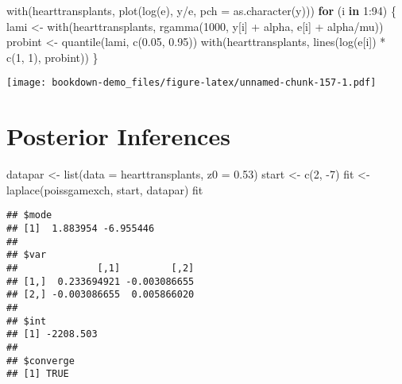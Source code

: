 \documentclass[
]{book}
\newenvironment{Shaded}{\begin{snugshade}}{\end{snugshade}}
\newcommand{\AttributeTok}[1]{\textcolor[rgb]{0.77,0.63,0.00}{#1}}
\newcommand{\ControlFlowTok}[1]{\textcolor[rgb]{0.13,0.29,0.53}{\textbf{#1}}}
\newcommand{\DecValTok}[1]{\textcolor[rgb]{0.00,0.00,0.81}{#1}}
\newcommand{\FloatTok}[1]{\textcolor[rgb]{0.00,0.00,0.81}{#1}}
\newcommand{\FunctionTok}[1]{\textcolor[rgb]{0.00,0.00,0.00}{#1}}
\newcommand{\NormalTok}[1]{#1}
\newcommand{\OtherTok}[1]{\textcolor[rgb]{0.56,0.35,0.01}{#1}}
\newcommand{\SpecialCharTok}[1]{\textcolor[rgb]{0.00,0.00,0.00}{#1}}
\begin{document}
\begin{Shaded}
\begin{Highlighting}[]
\FunctionTok{with}\NormalTok{(hearttransplants,}
     \FunctionTok{plot}\NormalTok{(}\FunctionTok{log}\NormalTok{(e), y}\SpecialCharTok{/}\NormalTok{e, }\AttributeTok{pch =} \FunctionTok{as.character}\NormalTok{(y)))}
 \ControlFlowTok{for}\NormalTok{ (i }\ControlFlowTok{in} \DecValTok{1}\SpecialCharTok{:}\DecValTok{94}\NormalTok{) \{}
\NormalTok{     lami }\OtherTok{\textless{}{-}} \FunctionTok{with}\NormalTok{(hearttransplants,}
           \FunctionTok{rgamma}\NormalTok{(}\DecValTok{1000}\NormalTok{, y[i] }\SpecialCharTok{+}\NormalTok{ alpha, }
\NormalTok{               e[i] }\SpecialCharTok{+}\NormalTok{ alpha}\SpecialCharTok{/}\NormalTok{mu))}
\NormalTok{     probint }\OtherTok{\textless{}{-}} \FunctionTok{quantile}\NormalTok{(lami, }\FunctionTok{c}\NormalTok{(}\FloatTok{0.05}\NormalTok{, }\FloatTok{0.95}\NormalTok{))}
     \FunctionTok{with}\NormalTok{(hearttransplants,}
          \FunctionTok{lines}\NormalTok{(}\FunctionTok{log}\NormalTok{(e[i]) }\SpecialCharTok{*} \FunctionTok{c}\NormalTok{(}\DecValTok{1}\NormalTok{, }\DecValTok{1}\NormalTok{), probint))}
\NormalTok{ \}}
\end{Highlighting}
\end{Shaded}

\texttt{[image: bookdown-demo\_files/figure-latex/unnamed-chunk-157-1.pdf]}

\hypertarget{posterior-inferences}{%
\section{Posterior Inferences}\label{posterior-inferences}}

\begin{Shaded}
\begin{Highlighting}[]
\NormalTok{datapar }\OtherTok{\textless{}{-}} \FunctionTok{list}\NormalTok{(}\AttributeTok{data =}\NormalTok{ hearttransplants, }\AttributeTok{z0 =} \FloatTok{0.53}\NormalTok{)}
\NormalTok{start }\OtherTok{\textless{}{-}} \FunctionTok{c}\NormalTok{(}\DecValTok{2}\NormalTok{, }\SpecialCharTok{{-}}\DecValTok{7}\NormalTok{)}
\NormalTok{fit }\OtherTok{\textless{}{-}} \FunctionTok{laplace}\NormalTok{(poissgamexch, start, datapar)}
\NormalTok{fit}
\end{Highlighting}
\end{Shaded}

\begin{verbatim}
## $mode
## [1]  1.883954 -6.955446
## 
## $var
##              [,1]         [,2]
## [1,]  0.233694921 -0.003086655
## [2,] -0.003086655  0.005866020
## 
## $int
## [1] -2208.503
## 
## $converge
## [1] TRUE
\end{verbatim}
\end{document}

